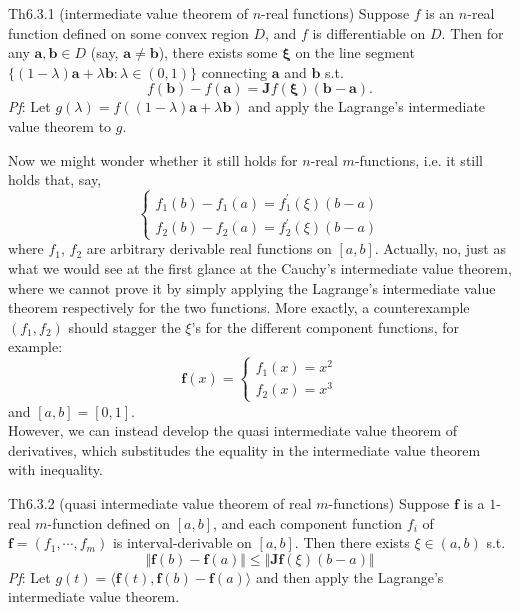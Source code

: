 \documentclass{article}
\begin{document}
\begin{Th}{Th6.3.1 (intermediate value theorem of $n$-real functions)}
    Suppose $f$ is an $n$-real function defined on some convex region $D$, and $f$ is differentiable on $D$. Then for any $\pmb{a}, \pmb{b}\in D$ (say, $\pmb{a} \neq \pmb{b}$), there exists some $\pmb{\xi}$ on the line segment $\{(1-\lambda)\pmb{a}+\lambda\pmb{b}: \lambda\in (0,1)\}$ connecting $\pmb{a}$ and $\pmb{b}$ s.t.
    $$ f(\pmb{b}) - f(\pmb{a}) = \pmb{J}f(\pmb{\xi})(\pmb{b}-\pmb{a}). $$
    \tcblower
    \textit{Pf}: Let $g(\lambda) = f\left((1-\lambda)\pmb{a}+\lambda\pmb{b}\right)$ and apply the Lagrange's intermediate value theorem to $g$.
\end{Th}

\begin{Rmk}{}
    Now we might wonder whether it still holds for $n$-real $m$-functions, i.e. it still holds that, say, 
    $$
    \begin{cases}
        f_1(b) - f_1(a) = f_1^\prime(\xi) (b-a) \\
        f_2(b) - f_2(a) = f_2^\prime(\xi) (b-a)
    \end{cases}
    $$
    where $f_1$, $f_2$ are arbitrary derivable real functions on $[a,b]$. Actually, no, just as what we would see at the first glance at the Cauchy's intermediate value theorem, where we cannot prove it by simply applying the Lagrange's intermediate value theorem respectively for the two functions. More exactly, a counterexample $(f_1, f_2)$ should stagger the $\xi$'s for the different component functions, for example:
    $$ \pmb{f}(x) = 
    \begin{cases}
        f_1(x) = x^2 \\
        f_2(x) = x^3
    \end{cases}
    $$
    and $[a,b] = [0,1]$. \\
    However, we can instead develop the quasi intermediate value theorem of derivatives, which substitudes the equality in the intermediate value theorem with inequality.
\end{Rmk}

\begin{Th}{Th6.3.2 (quasi intermediate value theorem of real $m$-functions)}
    Suppose $\pmb{f}$ is a $1$-real $m$-function defined on $[a,b]$, and each component function $f_i$ of $\pmb{f} = (f_1, \cdots, f_m)$ is interval-derivable on $[a,b]$. Then there exists $\xi\in (a,b)$ s.t.
    $$ \Vert \pmb{f}(b) - \pmb{f}(a) \Vert \leq \Vert \pmb{J f}(\xi) (b-a) \Vert $$
    \tcblower
    \textit{Pf}: Let $g(t) = \langle \pmb{f}(t), \pmb{f}(b)-\pmb{f}(a)\rangle$ and then apply the Lagrange's intermediate value theorem.
\end{Th}
\end{document}
